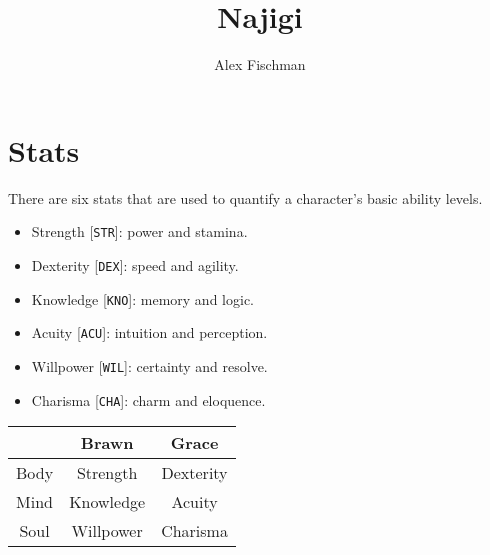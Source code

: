 \documentclass[12pt]{article}
\title{Najigi}
\author{Alex Fischman}
\newcommand{\STR}{\texttt{STR}}
\newcommand{\DEX}{\texttt{DEX}}
\newcommand{\KNO}{\texttt{KNO}}
\newcommand{\ACU}{\texttt{ACU}}
\newcommand{\WIL}{\texttt{WIL}}
\newcommand{\CHA}{\texttt{CHA}}
\begin{document}
\maketitle
\tableofcontents
\clearpage

\pagebreak
\section{Stats}

There are six stats that are used to quantify a character's basic ability levels.

\begin{multicols}{2}

\begin{itemize}
\item Strength [\STR]: power and stamina.
\item Dexterity [\DEX]: speed and agility.
\item Knowledge [\KNO]: memory and logic.
\item Acuity [\ACU]: intuition and perception.
\item Willpower [\WIL]: certainty and resolve.
\item Charisma [\CHA]: charm and eloquence.
\end{itemize}

\columnbreak

\begin{tabularx}{\linewidth}{C|C C}
& Brawn & Grace \\\hline
Body & Strength & Dexterity \\
Mind & Knowledge & Acuity \\
Soul & Willpower & Charisma
\end{tabularx}

\end{multicols}
\end{document}
